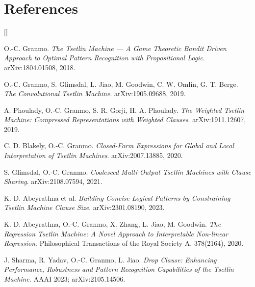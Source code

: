 \section*{References}

{\small\sloppy
\setlength{\parskip}{0.3em}
\begin{list}{\textcolor{ttorange}{[]}}%
  {\setlength{\leftmargin}{2.1em}\setlength{\labelwidth}{1.7em}%
   \setlength{\labelsep}{0.4em}\setlength{\itemsep}{0.35em}\setlength{\topsep}{0.6em}}

\item O.-C. Granmo. \emph{The Tsetlin Machine --- A Game Theoretic Bandit Driven Approach to
  Optimal Pattern Recognition with Propositional Logic}. arXiv:1804.01508, 2018.

\item O.-C. Granmo, S. Glimsdal, L. Jiao, M. Goodwin, C. W. Omlin, G. T. Berge.
  \emph{The Convolutional Tsetlin Machine}. arXiv:1905.09688, 2019.

\item A. Phoulady, O.-C. Granmo, S. R. Gorji, H. A. Phoulady.
  \emph{The Weighted Tsetlin Machine: Compressed Representations with Weighted Clauses}.
  arXiv:1911.12607, 2019.

\item C. D. Blakely, O.-C. Granmo. \emph{Closed-Form Expressions for Global and Local
  Interpretation of Tsetlin Machines}. arXiv:2007.13885, 2020.

\item S. Glimsdal, O.-C. Granmo. \emph{Coalesced Multi-Output Tsetlin Machines with Clause
  Sharing}. arXiv:2108.07594, 2021.

\item K. D. Abeyrathna et al. \emph{Building Concise Logical Patterns by Constraining Tsetlin
  Machine Clause Size}. arXiv:2301.08190, 2023.

\item K. D. Abeyrathna, O.-C. Granmo, X. Zhang, L. Jiao, M. Goodwin. \emph{The Regression
  Tsetlin Machine: A Novel Approach to Interpretable Non-linear Regression}. Philosophical
  Transactions of the Royal Society A, 378(2164), 2020.

\item J. Sharma, R. Yadav, O.-C. Granmo, L. Jiao. \emph{Drop Clause: Enhancing Performance,
  Robustness and Pattern Recognition Capabilities of the Tsetlin Machine}. AAAI 2023;
  arXiv:2105.14506.


\end{list}}
